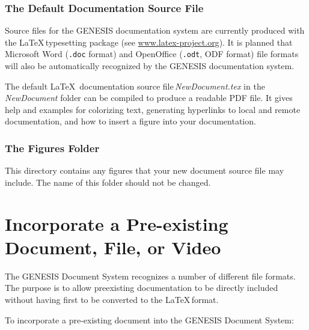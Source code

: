 \documentclass[12pt]{article}
\begin{document}
\subsubsection*{The Default Documentation Source File}

Source files for the GENESIS documentation system are currently produced with the \LaTeX\,typesetting package (see \href{http://www.latex-project.org/}{www.latex-project.org}). It is planned that Microsoft Word ({\tt .doc} format) and OpenOffice ({\tt .odt}, ODF format) file formats will also be automatically recognized by the GENESIS documentation system.

The default \LaTeX\, documentation source file\,{\it NewDocument.tex} in the {\it NewDocument} folder can be compiled to produce a readable PDF file. It gives help and examples for colorizing text, generating hyperlinks to local and remote documentation, and how to insert a figure into your documentation.

\subsubsection*{The Figures Folder}

This directory contains any figures that your new document source file may include. The name of this folder should not be changed.

\section*{Incorporate a Pre-existing Document, File, or Video}

The GENESIS Document System recognizes a number of different file formats. The purpose is to allow preexisting documentation to be directly included without having first to be converted to the \LaTeX\,format.

To incorporate a pre-existing document into the GENESIS Document System:
\end{document}
